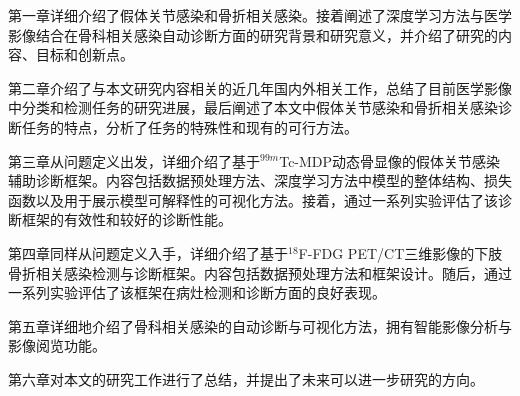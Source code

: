 第一章详细介绍了假体关节感染和骨折相关感染。接着阐述了深度学习方法与医学影像结合在骨科相关感染自动诊断方面的研究背景和研究意义，并介绍了研究的内容、目标和创新点。

第二章介绍了与本文研究内容相关的近几年国内外相关工作，总结了目前医学影像中分类和检测任务的研究进展，最后阐述了本文中假体关节感染和骨折相关感染诊断任务的特点，分析了任务的特殊性和现有的可行方法。

第三章从问题定义出发，详细介绍了基于\(^{99m}\)Tc-MDP动态骨显像的假体关节感染辅助诊断框架。内容包括数据预处理方法、深度学习方法中模型的整体结构、损失函数以及用于展示模型可解释性的可视化方法。接着，通过一系列实验评估了该诊断框架的有效性和较好的诊断性能。

第四章同样从问题定义入手，详细介绍了基于\(^{18}\)F-FDG PET/CT三维影像的下肢骨折相关感染检测与诊断框架。内容包括数据预处理方法和框架设计。随后，通过一系列实验评估了该框架在病灶检测和诊断方面的良好表现。

第五章详细地介绍了骨科相关感染的自动诊断与可视化方法，拥有智能影像分析与影像阅览功能。

第六章对本文的研究工作进行了总结，并提出了未来可以进一步研究的方向。











